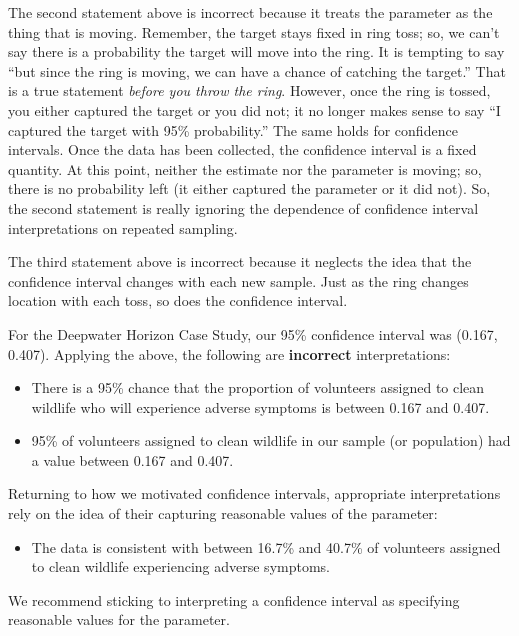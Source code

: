 \documentclass[
  letterpaper,
  DIV=11,
  numbers=noendperiod]{scrreprt}
\providecommand{\tightlist}{%
  \setlength{\itemsep}{0pt}\setlength{\parskip}{0pt}}\usepackage{longtable,booktabs,array}
\theoremstyle{plain}
\theoremstyle{definition}
\theoremstyle{definition}
\theoremstyle{remark}
\begin{document}
The second statement above is incorrect because it treats the parameter
as the thing that is moving. Remember, the target stays fixed in ring
toss; so, we can't say there is a probability the target will move into
the ring. It is tempting to say ``but since the ring is moving, we can
have a chance of catching the target.'' That is a true statement
\emph{before you throw the ring}. However, once the ring is tossed, you
either captured the target or you did not; it no longer makes sense to
say ``I captured the target with 95\% probability.'' The same holds for
confidence intervals. Once the data has been collected, the confidence
interval is a fixed quantity. At this point, neither the estimate nor
the parameter is moving; so, there is no probability left (it either
captured the parameter or it did not). So, the second statement is
really ignoring the dependence of confidence interval interpretations on
repeated sampling.

The third statement above is incorrect because it neglects the idea that
the confidence interval changes with each new sample. Just as the ring
changes location with each toss, so does the confidence interval.

For the Deepwater Horizon Case Study, our 95\% confidence interval was
(0.167, 0.407). Applying the above, the following are \textbf{incorrect}
interpretations:

\begin{itemize}
\tightlist
\item
  There is a 95\% chance that the proportion of volunteers assigned to
  clean wildlife who will experience adverse symptoms is between 0.167
  and 0.407.
\item
  95\% of volunteers assigned to clean wildlife in our sample (or
  population) had a value between 0.167 and 0.407.
\end{itemize}

Returning to how we motivated confidence intervals, appropriate
interpretations rely on the idea of their capturing reasonable values of
the parameter:

\begin{itemize}
\tightlist
\item
  The data is consistent with between 16.7\% and 40.7\% of volunteers
  assigned to clean wildlife experiencing adverse symptoms.
\end{itemize}

We recommend sticking to interpreting a confidence interval as
specifying reasonable values for the parameter.
\end{document}
